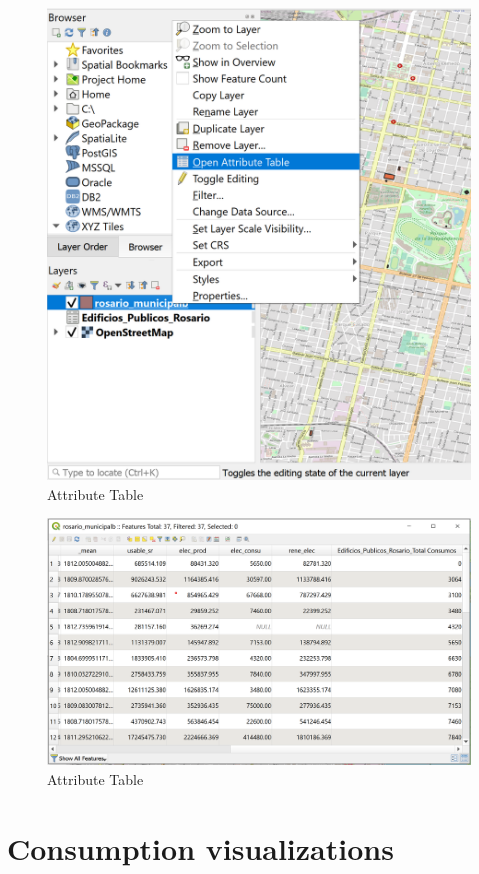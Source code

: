 \documentclass[
]{book}
\begin{document}
\begin{figure}

{\centering \includegraphics[width=0.7\linewidth]{images/attribute_table} 

}

\caption{Attribute Table}\label{fig:img-14}
\end{figure}
\begin{figure}

{\centering \includegraphics[width=1\linewidth]{images/attribute_table2} 

}

\caption{Attribute Table}\label{fig:img-141}
\end{figure}

\hypertarget{consumption-visualizations}{%
\section{Consumption visualizations}\label{consumption-visualizations}}
\end{document}
